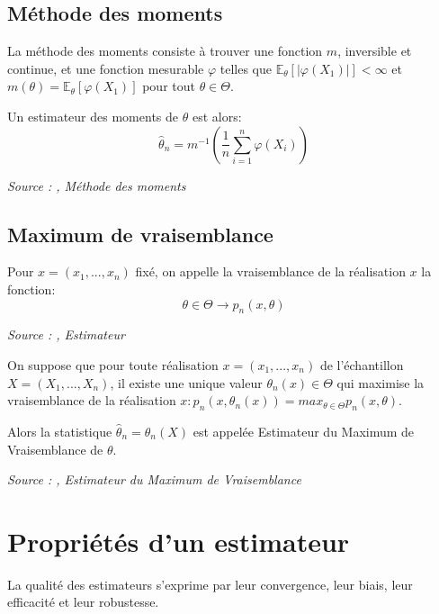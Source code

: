 \subsection{Méthode des moments}

\begin{definition}\label{def:methode_moments}
La méthode des moments consiste à trouver une fonction $m$, inversible et continue, et une fonction mesurable $\varphi$ telles que $\mathbb{E}_\theta[|\varphi(X_1)|] < \infty$ et $m(\theta) = \mathbb{E}_\theta[\varphi(X_1)]$ pour tout $\theta \in \Theta$.

Un estimateur des moments de $\theta$ est alors:
$$\hat{\theta}_n = m^{-1}(\frac{1}{n}\sum_{i = 1}^n \varphi(X_i))$$

\noindent\textit{Source : \cite{stat_ingenieur},  Méthode des moments}
\end{definition}


\subsection{Maximum de vraisemblance}

\begin{definition}\label{def:vraisemblance}
Pour $x = (x_1, ..., x_n)$ fixé, on appelle la vraisemblance de la réalisation $x$ la fonction:
$$\theta \in \Theta \rightarrow p_n(x, \theta)$$

\noindent\textit{Source : \cite{stat_ingenieur},  Estimateur}
\end{definition}

\begin{definition}\label{def:maximum_vraisemblance}
On suppose que pour toute réalisation $x = (x_1, ..., x_n)$ de l'échantillon $X = (X_1, ..., X_n)$, il existe une unique valeur $\theta_n(x) \in \Theta$ qui maximise la vraisemblance de la réalisation $x: p_n(x, \theta_n(x)) = max_{\theta \in \Theta}p_n(x, \theta).$

Alors la statistique $\hat{\theta}_n = \theta_n(X)$ est appelée Estimateur du Maximum de Vraisemblance de $\theta$.

\noindent\textit{Source : \cite{stat_ingenieur},  Estimateur du Maximum de Vraisemblance}
\end{definition}


\section{Propriétés d'un estimateur}
La qualité des estimateurs s'exprime par leur convergence, leur biais, leur efficacité et leur robustesse.


